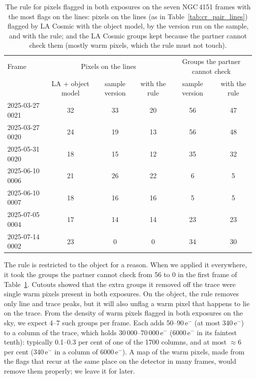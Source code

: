 \begin{table}[!htbp]
\centering\small
\caption{The rule for pixels flagged in both exposures on the seven NGC\,4151 frames with the most flags on the
lines: pixels on the lines (as in Table~\ref{tab:cr_pair_lines}) flagged by LA Cosmic with the object model, by the
version run on the sample, and with the rule; and the LA Cosmic groups kept because the partner cannot check them
(mostly warm pixels, which the rule must not touch).}
\label{tab:cr_pair_worst}
\begin{tabular}{lccccc}
\toprule
Frame & \multicolumn{3}{c}{Pixels on the lines} & \multicolumn{2}{c}{Groups the partner cannot check} \\
 & LA + object model & sample version & with the rule & sample version & with the rule \\
\midrule
2025-03-27 0021 & 32 & 33 & 20 & 56 & 47 \\
2025-03-27 0020 & 24 & 19 & 13 & 56 & 48 \\
2025-05-31 0020 & 18 & 15 & 12 & 35 & 32 \\
2025-06-10 0006 & 21 & 26 & 22 & 6 & 5 \\
2025-06-10 0007 & 18 & 16 & 16 & 5 & 5 \\
2025-07-05 0004 & 17 & 14 & 14 & 23 & 23 \\
2025-07-14 0002 & 23 & 0 & 0 & 34 & 30 \\
\bottomrule
\end{tabular}
\end{table}

The rule is restricted to the object for a reason. When we applied it everywhere, it took the groups the partner
cannot check from 56 to 0 in the first frame of Table~\ref{tab:cr_pair_worst}. Cutouts showed that the extra groups it
removed off the trace were single warm pixels present in both exposures. On the object, the rule removes only line and
trace peaks, but it will also unflag a warm pixel that happens to lie on the trace. From the density of warm pixels
flagged in both exposures on the sky, we expect 4--7 such groups per frame. Each adds 50--90\,e$^-$ (at most
340\,e$^-$) to a column of the trace, which holds 30\,000--70\,000\,e$^-$ (6000\,e$^-$ in its faintest tenth): typically 0.1--0.3 per
cent of one of the 1700 columns, and at most $\approx6$ per cent (340\,e$^-$ in a column of 6000\,e$^-$). A map of the warm pixels, made from the flags that recur at the same place on the
detector in many frames, would remove them properly; we leave it for later.


